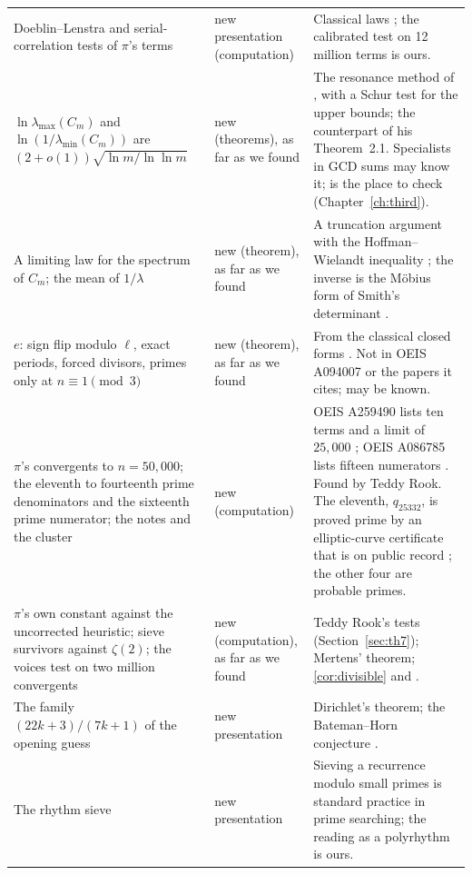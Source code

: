 \begin{longtable}{p{}p{}p{}}
Doeblin--Lenstra and serial-correlation tests of $\pi$'s terms \addedon{\revB} & new presentation (computation) & Classical laws \citep{BosmaJagerWiedijk1983}; the calibrated test on 12 million terms is ours. \\
$\ln\lambda_{\max}(C_m)$ and $\ln(1/\lambda_{\min}(C_m))$ are $(2 + o(1))\sqrt{\ln m/\ln\ln m}$ \addedon{\revC} & new (theorems), as far as we found & The resonance method of \citet{Soundararajan2008}, with a Schur test for the upper bounds; the counterpart of his Theorem~2.1. Specialists in GCD sums may know it; \citet{Hilberdink2009} is the place to check (Chapter~\ref{ch:third}). \\
A limiting law for the spectrum of $C_m$; the mean of $1/\lambda$ \addedon{\revC} & new (theorem), as far as we found & A truncation argument with the Hoffman--Wielandt inequality \citep{HoffmanWielandt1953}; the inverse is the Möbius form of Smith's determinant \citep{Smith1875}. \\
$e$: sign flip modulo $\ell$, exact periods, forced divisors, primes only at $n \equiv 1 \pmod 3$ \addedon{\revC} & new (theorem), as far as we found & From the classical closed forms \citep{Cohn2006}. Not in OEIS A094007 \citep{OEIS_A094007} or the papers it cites; may be known. \\
$\pi$'s convergents to $n = 50{,}000$; the eleventh to fourteenth prime denominators and the sixteenth prime numerator; the notes and the cluster \addedon{\revC} & new (computation) & OEIS A259490 lists ten terms and a limit of $25{,}000$ \citep{OEIS_A259490}; OEIS A086785 lists fifteen numerators \citep{OEIS_A086785}. Found by Teddy Rook. The eleventh, $q_{25332}$, is proved prime by an elliptic-curve certificate that is on public record \citep{FactorDBq25332}; the other four are probable primes. \addedon{\revG} \\
$\pi$'s own constant against the uncorrected heuristic; sieve survivors against $\zeta(2)$; the voices test on two million convergents \addedon{\revC} & new (computation), as far as we found & Teddy Rook's tests (Section~\ref{sec:th7}); Mertens' theorem; \cref{cor:divisible} and \citet{JagerLiardet1988}. \\
The family $(22k+3)/(7k+1)$ of the opening guess \addedon{\revC} & new presentation & Dirichlet's theorem; the Bateman--Horn conjecture \citep{BatemanHorn1962}. \\
The rhythm sieve \addedon{\revC} & new presentation & Sieving a recurrence modulo small primes is standard practice in prime searching; the reading as a polyrhythm is ours. \\

\end{longtable}
